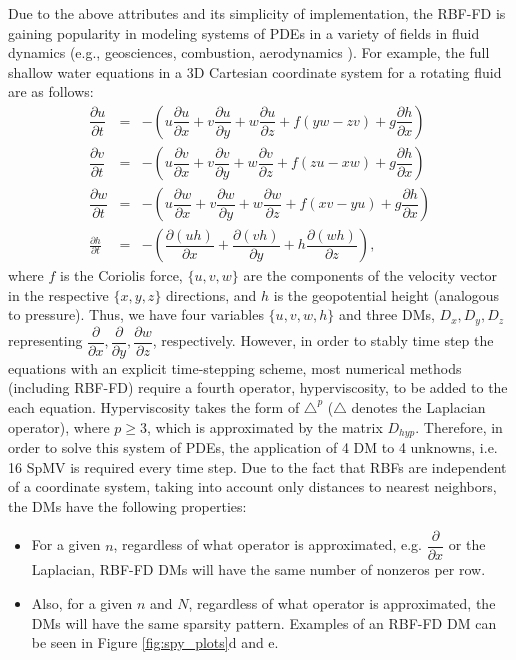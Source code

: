 Due to the above attributes and its simplicity of implementation, the RBF-FD is gaining popularity in modeling systems of PDEs in a variety of fields in fluid dynamics (e.g., geosciences, combustion, aerodynamics \cite{Bayona13,CDNT,FoL11,FLBWSC12,SPLM}). For example, the full shallow water equations in a 3D Cartesian coordinate system for a rotating fluid are as follows:
\begin{eqnarray}
\dfrac{\partial u}{\partial t} &=& - \left( u\dfrac{\partial u}{\partial x} + v\dfrac{\partial u}{\partial y} + w\dfrac{\partial u}{\partial z} + f(yw - zv) + g\dfrac{\partial h}{\partial x} \right)
\\
\dfrac{\partial v}{\partial t} &=& - \left( u\dfrac{\partial v}{\partial x} + v\dfrac{\partial v}{\partial y} + w\dfrac{\partial v}{\partial z} + f(zu - xw) + g\dfrac{\partial h}{\partial x} \right)
\\
\dfrac{\partial w}{\partial t} &=& - \left( u\dfrac{\partial w}{\partial x} + v\dfrac{\partial w}{\partial y} + w\dfrac{\partial w}{\partial z} + f(xv - yu) + g\dfrac{\partial h}{\partial x} \right)
\\
\frac{\partial h}{\partial t}& =&-\left(\dfrac{\partial (uh)}{\partial x} + \dfrac{\partial (vh)}{\partial y} + h\dfrac{\partial (wh)}{\partial z}\right) , \label{height}
\end{eqnarray}
where $f$ is the Coriolis force, $\{u,v,w\}$ are the components of the velocity vector in the respective $\{x,y,z\}$ directions, and $h$ is the geopotential height (analogous to pressure). Thus, we have four variables $\{u,v,w,h\}$ and three DMs, $D_x, D_y, D_z$ representing $\dfrac{\partial}{\partial x}, \dfrac{\partial}{\partial y},\dfrac{\partial w}{\partial z}$, respectively. However, in order to stably time step the equations with an explicit time-stepping scheme, most numerical methods (including RBF-FD) require a fourth operator, hyperviscosity, to be added to the each equation. Hyperviscosity takes the form of $\triangle^p$ ($\triangle$ denotes the Laplacian operator), where $p\geq3$, which is approximated by the matrix $D_{hyp}$. Therefore, in order to solve this system of PDEs, the application of 4 DM to 4 unknowns, i.e. 16 SpMV is required every time step. Due to the fact that RBFs are independent of a coordinate system, taking into account only distances to nearest neighbors, the DMs have the following properties:
\begin{itemize}
\item For a given $n$, regardless of what operator is approximated, e.g. $\dfrac{\partial}{\partial x}$ or the Laplacian, RBF-FD DMs will have the same number of nonzeros per row.
\item Also, for a given $n$ and $N$, regardless of what operator is approximated, the DMs will have the same sparsity pattern. Examples of an RBF-FD DM can be seen in Figure \ref{fig:spy_plots}d and e.
\end{itemize}

